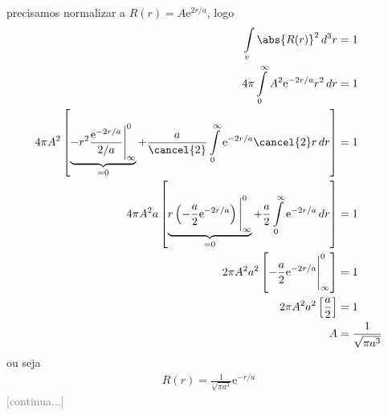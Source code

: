 \begin{prob}
\begin{sol}
\begin{enumerate}[label=\alph *)]
				 precisamos normalizar a $R(r)=A\mathrm{e}^{2r/a}$, logo
				 \begin{align}
					 \begin{split}
						 \int\limits_{v}\abs{R(r)}^{2}\,d^{3}r &= 1\\
						 4 \pi \int\limits_{0}^{\infty}A^{2}\mathrm{e}^{-2r/a}r^{2}\,d{r} &= 1\\
						 4 \pi A^{2} \left[\underbrace{ -r^{2}\frac{\mathrm{e}^{-2r/a}}{2/a}\Bigg|^{0}_{\infty}}_{=0}+\frac{a}{\cancel{2}}\int\limits_{0}^{\infty}\mathrm{e}^{-2r/a}\cancel{2}r\,d{r}\right] &= 1\\
						 4 \pi A^{2}a \left[\underbrace{r\left(-\frac{a}{2}\mathrm{e}^{-2r/a}\right)\Bigg|^{0}_{\infty} }_{=0}+\frac{a}{2}\int\limits_{0}^{\infty}\mathrm{e}^{-2r/a}\,d{r}\right] &= 1\\
						 2 \pi A^{2} a^{2}\left[-\frac{a}{2}\mathrm{e}^{-2r/a}\Bigg|^{0}_{\infty} \right] &= 1\\
						 2\pi A^{2} a^{2} \left[\frac{a}{2}\right] &= 1\\
						 A &= \frac{1}{\sqrt{\pi a^{3}}}
					 \end{split}
				 \end{align}
				 ou seja
				 \begin{align}
				 	\boxed{
						R(r)=\frac{1}{\sqrt{\pi a^{3}}}\mathrm{e}^{-r/a}
					}	
				 \end{align}
				 \textcolor{gray}{[continua...]}
		 \end{enumerate}
	 \end{sol}

 \end{prob}


